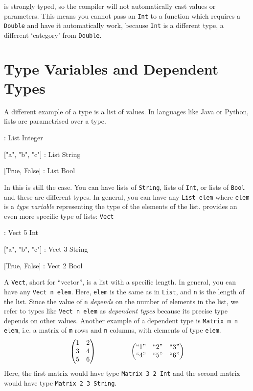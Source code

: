     \Idris is strongly typed, so the compiler will not automatically cast values or parameters. This means you cannot pass an \texttt{Int} to a function which requires a \texttt{Double} and have it automatically work, because \texttt{Int} is a different type, a different `category' from \texttt{Double}.
    
\section{Type Variables and Dependent Types}
    A different example of a type is a list of values. In languages like Java or Python, lists are parametrised over a type.
    \begin{code}[caption={The types of different lists in \Idris}]
        [1, 2, 3, 4, 5] : List Integer
        
        ["a", "b", "c"] : List String
        
        [True, False]   : List Bool
    \end{code}
    In \Idris this is still the case. You can have lists of \texttt{String}, lists of \texttt{Int}, or lists of \texttt{Bool} and these are different types. In general, you can have any \texttt{List elem} where \texttt{elem} is a \textit{type variable} representing the type of the elements of the list. \Idris provides an even more specific type of lists: \texttt{Vect}
    \begin{code}[caption={Example \texttt{Vect} types}]
        [1, 2, 3, 4, 5] : Vect 5 Int
        
        ["a", "b", "c"] : Vect 3 String
        
        [True, False]   : Vect 2 Bool
    \end{code}
    A \texttt{Vect}, short for ``vector'', is a list with a specific length. In general, you can have any \texttt{Vect n elem}. Here, \texttt{elem} is the same as in \texttt{List}, and \texttt{n} is the length of the list. Since the value of \texttt{n} \textit{depends} on the number of elements in the list, we refer to types like \texttt{Vect n elem} as \textit{dependent types} because its precise type depends on other values. Another example of a dependent type is \texttt{Matrix m n elem}, i.e. a matrix of \texttt{m} rows and \texttt{n} columns, with elements of type \texttt{elem}.
    \[
    \begin{pmatrix}
    1 & 2 \\
    3 & 4 \\
    5 & 6 \\
    \end{pmatrix}
    \hspace{50pt}
    \begin{pmatrix}
    ``1" & ``2" & ``3" \\
    ``4" & ``5" & ``6" \\
    \end{pmatrix}
    \]
    Here, the first matrix would have type \texttt{Matrix 3 2 Int} and the second matrix would have type \texttt{Matrix 2 3 String}.
    
